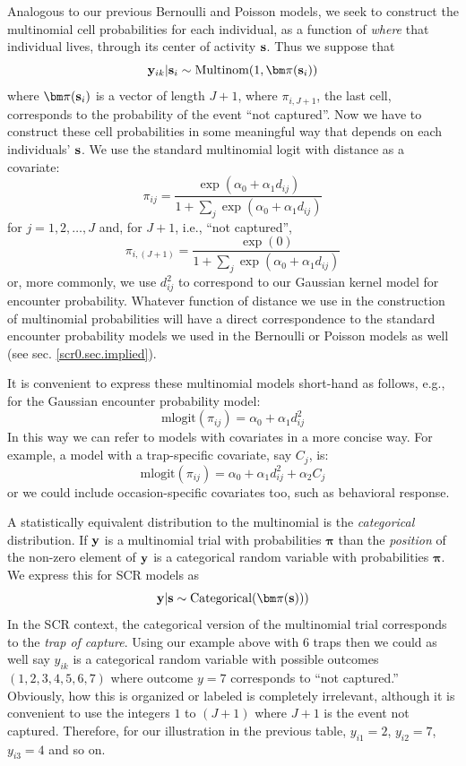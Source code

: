 Analogous to our previous Bernoulli and Poisson models, we seek to
construct the multinomial cell probabilities for each individual, as a
function of {\it where} that individual lives, through its center of
activity ${\bf s}$. Thus we suppose that
\begin{equation}
 {\bf y}_{ik}|{\bf s}_{i} \sim \mbox{Multinom}(1, {\bm \pi}({\bf s}_{i}) )
\label{poisson-mn.eq.mn}
\end{equation}
where ${\bm \pi}({\bf s}_{i})$ is a vector of length $J+1$, where
 $\pi_{i,J+1}$, the last cell, corresponds
 to the probability of the event ``not captured''.
Now we have to
construct these cell probabilities in some meaningful way that depends
on each individuals' ${\bf s}$.
We use the standard
multinomial logit with distance as a covariate:
\[
 \pi_{ij} = \frac{  \exp(\alpha_{0} + \alpha_{1} d_{ij}) }{ 1+ \sum_{j}
   \exp(\alpha_{0} + \alpha_{1} d_{ij})}
\]
for $j=1,2,\ldots,J$ and, for $J+1$, i.e., ``not captured'',
\[
 \pi_{i,(J+1)} = \frac{  \exp(0) }
                    { 1+ \sum_{j} \exp(\alpha_{0} + \alpha_{1} d_{ij})}
\]
or, more commonly, we use $d_{ij}^{2}$ to correspond to our Gaussian
kernel model for encounter probability. Whatever function of distance
we use in the construction of multinomial probabilities will have a
direct correspondence to the standard encounter probability models we
used in the Bernoulli or Poisson models as well (see
sec. \ref{scr0.sec.implied}). 

It is convenient to express these multinomial models short-hand as
follows, e.g., for the Gaussian encounter probability model:
\[
\mbox{mlogit}( \pi_{ij} ) = \alpha_{0} + \alpha_{1} d_{ij}^{2}
\]
In this way we can refer to models with covariates in a more concise
way. For example, a model with a trap-specific covariate, say $C_{j}$, is:
\[
\mbox{mlogit}( \pi_{ij} ) = \alpha_{0} + \alpha_{1} d_{ij}^{2} + \alpha_{2} C_{j}
\]
or we could include occasion-specific covariates too, such as
behavioral response. 

A statistically equivalent distribution to the multinomial is the {\it categorical}
distribution.  If ${\bf y}$ is a multinomial trial with probabilities
${\bm \pi}$ than the {\it position} of the non-zero element of ${\bf
  y}$ is a categorical random variable with probabilities ${\bm \pi}$.
We express this for SCR models as
\[
{\bf y}|{\bf s} \sim \mbox{Categorical}( {\bm \pi}({\bf s})) )
\]
In the SCR context, the categorical version of the multinomial trial
corresponds to the {\it trap of capture}.  Using our example above
with 6 traps then we could as well say $y_{ik}$ is a categorical
random variable with possible outcomes $(1,2,3,4,5,6,7)$ where outcome
$y=7$ corresponds to ``not captured.'' Obviously, how this is
organized or labeled is completely irrelevant, although it is
convenient to use the integers $1$ to $(J+1)$ where $J+1$ is the event
not captured.  Therefore, for our illustration in the previous table,
$y_{i1} = 2$, $y_{i2} = 7$, $y_{i3} = 4$ and so on.

